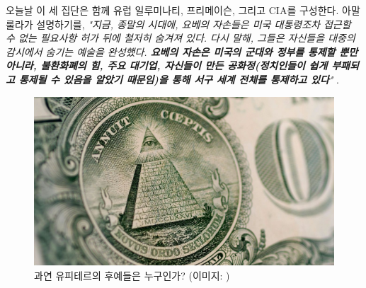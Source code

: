 \documentclass[10pt,twocolumn,letterpaper]{article}
\begin{document}
오늘날 이 세 집단은 함께 유럽 일루미나티, 프리메이슨, 그리고 CIA를 구성한다. 아말룰라가 설명하기를, \textit{"지금, 종말의 시대에, 요베의 자손들은 미국 대통령조차 접근할 수 없는 필요사항 허가 뒤에 철저히 숨겨져 있다. 다시 말해, 그들은 자신들을 대중의 감시에서 숨기는 예술을 완성했다. \textbf{요베의 자손은 미국의 군대와 정부를 통제할 뿐만 아니라, 불환화폐의 힘, 주요 대기업, 자신들이 만든 공화정(정치인들이 쉽게 부패되고 통제될 수 있음을 알았기 때문임)을 통해 서구 세계 전체를 통제하고 있다}"} \cite{33,34}.

\begin{figure}[h]
\begin{center}
   \includegraphics[width=1\linewidth]{illuminati.jpg}

\end{center}
   \caption{과연 유피테르의 후예들은 누구인가? (이미지: \cite{35})}
\label{fig:10}
\label{fig:onecol}
\end{figure}
\end{document}
